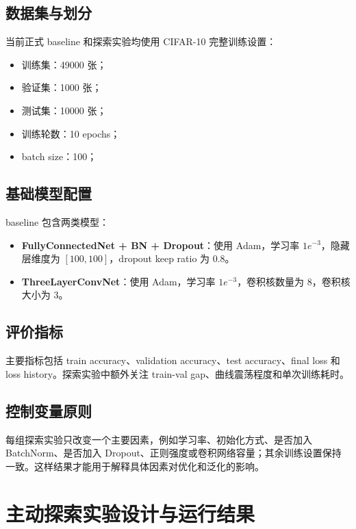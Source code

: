 \documentclass[UTF8]{ctexart}
\begin{document}
\subsection{数据集与划分}

当前正式 baseline 和探索实验均使用 CIFAR-10 完整训练设置：
\begin{itemize}
  \item 训练集：49000 张；
  \item 验证集：1000 张；
  \item 测试集：10000 张；
  \item 训练轮数：10 epochs；
  \item batch size：100；
\end{itemize}

\subsection{基础模型配置}

baseline 包含两类模型：
\begin{itemize}
  \item \textbf{FullyConnectedNet + BN + Dropout}：使用 Adam，学习率 $1e^{-3}$，隐藏层维度为 $[100,100]$，dropout keep ratio 为 0.8。
  \item \textbf{ThreeLayerConvNet}：使用 Adam，学习率 $1e^{-3}$，卷积核数量为 8，卷积核大小为 3。
\end{itemize}

\subsection{评价指标}

主要指标包括 train accuracy、validation accuracy、test accuracy、final loss 和 loss history。探索实验中额外关注 train-val gap、曲线震荡程度和单次训练耗时。

\subsection{控制变量原则}

每组探索实验只改变一个主要因素，例如学习率、初始化方式、是否加入 BatchNorm、是否加入 Dropout、正则强度或卷积网络容量；其余训练设置保持一致。这样结果才能用于解释具体因素对优化和泛化的影响。

\section{主动探索实验设计与运行结果}
\end{document}
